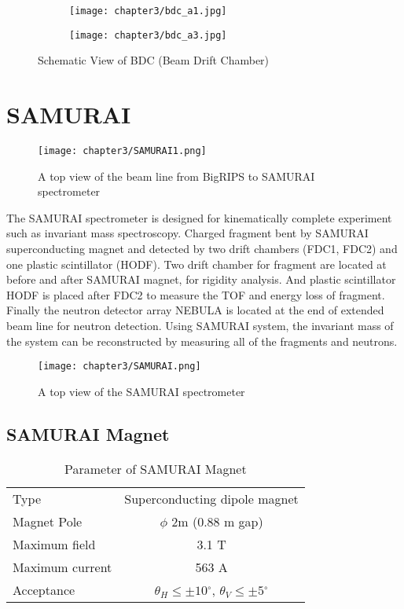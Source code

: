 \begin{figure}[h]
    \centering
    \begin{subfigure}{\textwidth}
        \texttt{[image: chapter3/bdc\_a1.jpg]}    
    \end{subfigure}
    \begin{subfigure}{\textwidth}
        \texttt{[image: chapter3/bdc\_a3.jpg]}
    \end{subfigure}
    \caption{Schematic View of BDC (Beam Drift Chamber) \cite{SAMURAI}}
\end{figure}

\clearpage

\section{SAMURAI}

\begin{figure}[hbt!]
    \centering
    \texttt{[image: chapter3/SAMURAI1.png]}
    \caption{A top view of the beam line from BigRIPS to SAMURAI spectrometer}
\end{figure}

The SAMURAI spectrometer is designed for kinematically complete experiment such as invariant mass spectroscopy. \cite{SAMURAIConcept} Charged fragment bent by SAMURAI superconducting magnet and detected by two drift chambers (FDC1, FDC2) and one plastic scintillator (HODF). Two drift chamber for fragment are located at before and after SAMURAI magnet, for rigidity analysis. And plastic scintillator HODF is placed after FDC2 to measure the TOF and energy loss of fragment. Finally the neutron detector array NEBULA is located at the end of extended beam line for neutron detection. Using SAMURAI system, the invariant mass of the system can be reconstructed by measuring all of the fragments and neutrons.

\begin{figure}[t]
    \centering
    \texttt{[image: chapter3/SAMURAI.png]}
    \caption{A top view of the SAMURAI spectrometer}
\end{figure}

\subsection{SAMURAI Magnet}

\begin{table}[h]
    \centering 
    \begin{tabular}{l|c}
    \hline
    Type & Superconducting dipole magnet \\
    Magnet Pole & $\phi$ 2m (0.88 m gap) \\
    Maximum field & 3.1 T \\
    Maximum current & 563 A \\
    Acceptance & $\theta_H \leq \pm 10{}^{\circ}$, $\theta_V \leq \pm 5{}^{\circ}$\\
    \hline
    \end{tabular}
    \caption{Parameter of SAMURAI Magnet \cite{SAMURAI}}
\end{table}

